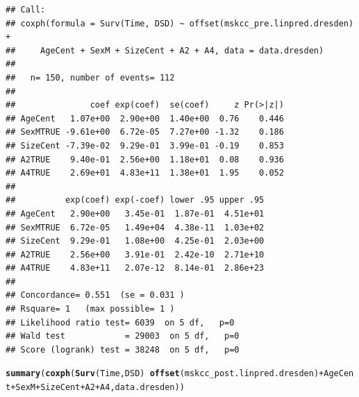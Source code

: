 \documentclass{article}\usepackage[]{graphicx}\usepackage[]{color}
\makeatletter
\newcommand{\hlopt}[1]{\textcolor[rgb]{0,0,0}{#1}}%
\newcommand{\hlstd}[1]{\textcolor[rgb]{0.345,0.345,0.345}{#1}}%
\newcommand{\hlkwd}[1]{\textcolor[rgb]{0.737,0.353,0.396}{\textbf{#1}}}%
\newenvironment{kframe}{%
 \def\at@end@of@kframe{}%
 \ifinner\ifhmode%
  \def\at@end@of@kframe{\end{minipage}}%
  \begin{minipage}{\columnwidth}%
 \fi\fi%
 \def\FrameCommand##1{\hskip\@totalleftmargin \hskip-\fboxsep
 \colorbox{shadecolor}{##1}\hskip-\fboxsep
     \hskip-\linewidth \hskip-\@totalleftmargin \hskip\columnwidth}%
 \MakeFramed {\advance\hsize-\width
   \@totalleftmargin\z@ \linewidth\hsize
   \@setminipage}}%
 {\par\unskip\endMakeFramed%
 \at@end@of@kframe}
\newenvironment{knitrout}{}{} %
\makeatother
\begin{document}
\begin{knitrout}
\begin{kframe}
{\ttfamily\noindent\color{warningcolor}{\#\# Warning in fitter(X, Y, strats, offset, init, control, weights = weights, : Ran out of iterations and did not converge}}\begin{verbatim}
## Call:
## coxph(formula = Surv(Time, DSD) ~ offset(mskcc_pre.linpred.dresden) + 
##     AgeCent + SexM + SizeCent + A2 + A4, data = data.dresden)
## 
##   n= 150, number of events= 112 
## 
##               coef exp(coef)  se(coef)     z Pr(>|z|)
## AgeCent   1.07e+00  2.90e+00  1.40e+00  0.76    0.446
## SexMTRUE -9.61e+00  6.72e-05  7.27e+00 -1.32    0.186
## SizeCent -7.39e-02  9.29e-01  3.99e-01 -0.19    0.853
## A2TRUE    9.40e-01  2.56e+00  1.18e+01  0.08    0.936
## A4TRUE    2.69e+01  4.83e+11  1.38e+01  1.95    0.052
## 
##          exp(coef) exp(-coef) lower .95 upper .95
## AgeCent   2.90e+00   3.45e-01  1.87e-01  4.51e+01
## SexMTRUE  6.72e-05   1.49e+04  4.38e-11  1.03e+02
## SizeCent  9.29e-01   1.08e+00  4.25e-01  2.03e+00
## A2TRUE    2.56e+00   3.91e-01  2.42e-10  2.71e+10
## A4TRUE    4.83e+11   2.07e-12  8.14e-01  2.86e+23
## 
## Concordance= 0.551  (se = 0.031 )
## Rsquare= 1   (max possible= 1 )
## Likelihood ratio test= 6039  on 5 df,   p=0
## Wald test            = 29003  on 5 df,   p=0
## Score (logrank) test = 38248  on 5 df,   p=0
\end{verbatim}
\begin{alltt}
\hlkwd{summary}\hlstd{(}\hlkwd{coxph}\hlstd{(}\hlkwd{Surv}\hlstd{(Time, DSD)} \hlopt{~} \hlkwd{offset}\hlstd{(mskcc_post.linpred.dresden)} \hlopt{+} \hlstd{AgeCent} \hlopt{+} \hlstd{SexM} \hlopt{+} \hlstd{SizeCent} \hlopt{+} \hlstd{A2} \hlopt{+} \hlstd{A4, data.dresden))}
\end{alltt}


{\ttfamily\noindent\color{warningcolor}{\#\# Warning in fitter(X, Y, strats, offset, init, control, weights = weights, : Ran out of iterations and did not converge}}


\end{kframe}
\end{knitrout}
\end{document}
